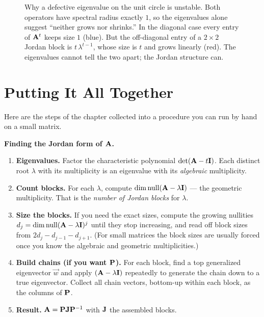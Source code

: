 \begin{figure}[H]
\centering
{}
\caption{Why a defective eigenvalue on the unit circle is unstable. Both operators have
spectral radius exactly $1$, so the eigenvalues alone suggest ``neither grows nor shrinks.''
In the diagonal case every entry of $\mathbf{A}^t$ keeps size $1$ (blue). But the off-diagonal
entry of a $2\times2$ Jordan block is $t\,\lambda^{t-1}$, whose size is $t$ and grows
linearly (red). The eigenvalues cannot tell the two apart; the Jordan structure can.}
\label{ch28:transient}
\end{figure}

\section{Putting It All Together}
\label{ch28:together}

Here are the steps of the chapter collected into a procedure you can run by hand on a
small matrix.

\begin{formalbox}
\textbf{Finding the Jordan form of $\mathbf{A}$.}
\begin{enumerate}
\item \textbf{Eigenvalues.} Factor the characteristic polynomial
  $\det(\mathbf{A}-t\mathbf{I})$. Each distinct root $\lambda$ with its multiplicity is an
  eigenvalue with its \emph{algebraic} multiplicity.
\item \textbf{Count blocks.} For each $\lambda$, compute
  $\operatorname{dim}\operatorname{null}(\mathbf{A}-\lambda\mathbf{I})$ --- the geometric multiplicity. That is the
  \emph{number of Jordan blocks} for $\lambda$.
\item \textbf{Size the blocks.} If you need the exact sizes, compute the growing
  nullities $d_j=\operatorname{dim}\operatorname{null}(\mathbf{A}-\lambda\mathbf{I})^j$ until they stop increasing, and
  read off block sizes from $2d_j-d_{j-1}-d_{j+1}$. (For small matrices the block sizes
  are usually forced once you know the algebraic and geometric multiplicities.)
\item \textbf{Build chains (if you want $\mathbf{P}$).} For each block, find a top
  generalized eigenvector $\vec{w}$ and apply $(\mathbf{A}-\lambda\mathbf{I})$ repeatedly to
  generate the chain down to a true eigenvector. Collect all chain vectors, bottom-up
  within each block, as the columns of $\mathbf{P}$.
\item \textbf{Result.} $\mathbf{A}=\mathbf{P}\mathbf{J}\mathbf{P}^{-1}$ with $\mathbf{J}$ the assembled
  blocks.
\end{enumerate}
\end{formalbox}


